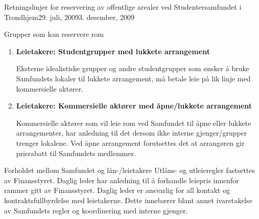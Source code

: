 \begin{instruks}{Retningslinjer for reservering av offentlige arealer
    ved Studentersamfundet i Trondhjem}{29. juli, 2009}{3. desember, 2009}
\begin{instruksledd}{Grupper som kan reservere rom}
\begin{enumerate}
                Eksterne idealistiske studentgrupper som ønsker å legge sine arrangementer
                til Samfundet
                slipper å betale for romreservasjon under forutsetning av at
                arrangementene er åpne for alle
                Samfundets medlemmer og at arrangør ikke har økonomisk inntjening på
                arrangementet.
                Med ”eksterne idealistiske grupper” forstås i denne instruksen
                studenter/grupper av studenter
                som ikke er tilknyttet gjengene på Samfundet, og som ønsker å legge
                arrangementer av
                kulturell, politisk eller faglig art til Samfundet. Låntakeren skal
                fortrinnsvis være medlem av
                Samfundet, arrangementene skal være åpne for alle våre medlemmer og
                medlemmer skal ha
                rabatt ved eventuell inngangsbillett. Linjeforeningsfester og andre
                lukkede arrangement faller
                inn under utleie (se punkt 3.3 og 3.4).

            \item \textbf{Leietakere: Studentgrupper med lukkete arrangement}

                Eksterne idealistiske grupper og andre studentgrupper som ønsker å bruke
                Samfundets lokaler
                til lukkete arrangement, må betale leie på lik linje med kommersielle
                aktører.

            \item \textbf{ Leietakere: Kommersielle aktører med åpne/lukkete arrangement}

                Kommersielle aktører som vil leie rom ved Samfundet til åpne eller lukkete
                arrangementer,
                har anledning til det dersom ikke interne gjenger/grupper trenger
                lokalene. Ved åpne
                arrangement forutsettes det at arrangøren gir prisrabatt til Samfundets
                medlemmer.
        \end{enumerate}
    \end{instruksledd}

    \begin{instruksledd}{Forholdet mellom Samfundet og lån-/leietakere}
        Utlåns- og utleieregler fastsettes av Finansstyret. Daglig leder har anledning
        til å forhandle
        leiepris innenfor rammer gitt av Finansstyret.
        Daglig leder er ansvarlig for all kontakt og kontraktsfullbyrdelse med
        leietakerne. Dette innebærer blant annet
        ivaretakelse av Samfundets regler og koordinering med interne gjenger.


\end{instruksledd}
\end{instruks}
